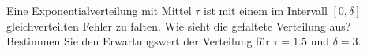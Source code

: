 
Eine Exponentialverteilung mit Mittel $\tau$ ist mit einem im Intervall
$[0,\delta]$ gleichverteilten Fehler zu falten.
Wie sieht die gefaltete Verteilung aus?
Bestimmen Sie den Erwartungswert der Verteilung f\"ur $\tau = 1.5$
und $\delta = 3$.


\answer{}
